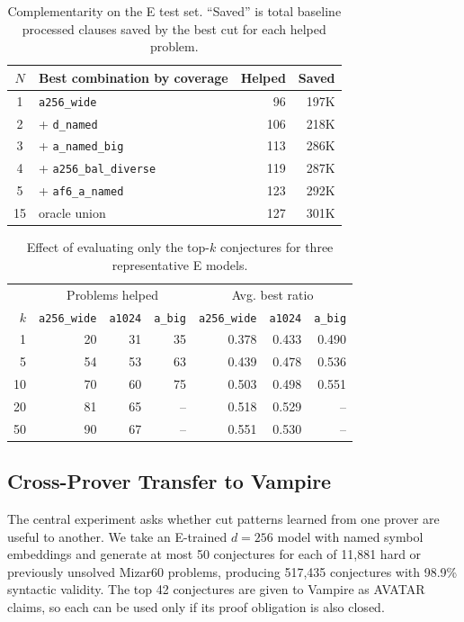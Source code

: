 \documentclass{easychair}
\newcommand{\Eprover}{E\xspace}
\newcommand{\Vampire}{Vampire\xspace}
\begin{document}
\begin{table}[t]
\centering
\caption{Complementarity on the \Eprover test set.  ``Saved'' is total
baseline processed clauses saved by the best cut for each helped
problem.}
\label{tab:ensemble}
\small
\begin{tabular}{clrr}
\toprule
$N$ & Best combination by coverage & Helped & Saved \\
\midrule
1 & \texttt{a256\_wide} & 96 & 197K \\
2 & + \texttt{d\_named} & 106 & 218K \\
3 & + \texttt{a\_named\_big} & 113 & 286K \\
4 & + \texttt{a256\_bal\_diverse} & 119 & 287K \\
5 & + \texttt{af6\_a\_named} & 123 & 292K \\
\midrule
15 & oracle union & 127 & 301K \\
\bottomrule
\end{tabular}
\end{table}

\begin{table}[t]
\centering
\caption{Effect of evaluating only the top-$k$ conjectures for three
representative \Eprover models.}
\label{tab:rank}
\small
\begin{tabular}{r|rrr|rrr}
\toprule
 & \multicolumn{3}{c|}{Problems helped}
 & \multicolumn{3}{c}{Avg. best ratio} \\
$k$ & \texttt{a256\_wide} & \texttt{a1024} & \texttt{a\_big}
    & \texttt{a256\_wide} & \texttt{a1024} & \texttt{a\_big} \\
\midrule
1  & 20 & 31 & 35 & 0.378 & 0.433 & 0.490 \\
5  & 54 & 53 & 63 & 0.439 & 0.478 & 0.536 \\
10 & 70 & 60 & 75 & 0.503 & 0.498 & 0.551 \\
20 & 81 & 65 & -- & 0.518 & 0.529 & -- \\
50 & 90 & 67 & -- & 0.551 & 0.530 & -- \\
\bottomrule
\end{tabular}
\end{table}

\subsection{Cross-Prover Transfer to Vampire}

The central experiment asks whether cut patterns learned from one
prover are useful to another.  We take an \Eprover-trained $d=256$
model with named symbol embeddings and generate at most 50 conjectures for each
of 11,881 hard or previously unsolved Mizar60 problems, producing
517,435 conjectures with 98.9\% syntactic validity.  The top 42 conjectures
are given to \Vampire as AVATAR claims, so each can be used only if its
proof obligation is also closed.
\end{document}
